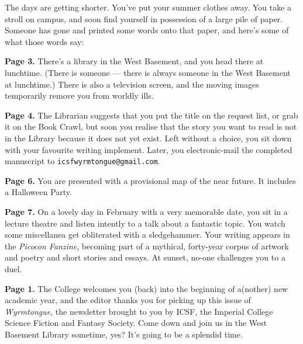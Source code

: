 The days are getting shorter. You've put your summer clothes away. You
take a stroll on campus, and soon find yourself in possession of a
large pile of paper. Someone has gone and printed some words onto that
paper, and here's some of what those words say:

\textbf{Page 3.}
There's a library in the West Basement, and you head there at
lunchtime. (There is someone --- there is always someone in the West
Basement at lunchtime.) There is also a television screen, and the
moving images temporarily remove you from worldly ills.

\textbf{Page 4.}
The Librarian suggests that you put the title on the request list, or
grab it on the Book Crawl, but soon you realise that the story you
want to read is not in the Library because it does not yet exist. Left
without a choice, you sit down with your favourite writing
implement. Later, you electronic-mail the completed manuscript
to \texttt{icsfwyrmtongue@gmail.com}.

\textbf{Page 6.}
You are presented with a provisional map of the near future. It
includes a Halloween Party.

\textbf{Page 7.}
On a lovely day in February with a very memorable date, you sit in a
lecture theatre and listen intently to a talk about a fantastic
topic. You watch some miscellanea get obliterated with a
sledgehammer. Your writing appears in the \textit{Picocon Fanzine},
becoming part of a mythical, forty-year corpus of artwork and poetry
and short stories and essays. At sunset, no-one challenges you to a
duel.

\textbf{Page 1.}
The College welcomes you (back) into the beginning of a(nother) new
academic year, and the editor thanks you for picking up this issue
of \textit{Wyrmtongue}, the newsletter brought to you by ICSF, the
Imperial College Science Fiction and Fantasy Society. Come down and
join us in the West Basement Library sometime, yes? It's going to be a
splendid time.
